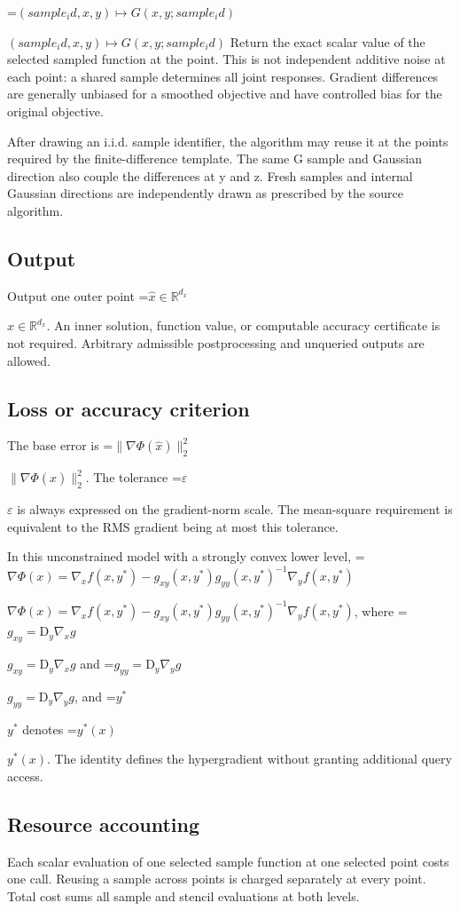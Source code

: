 \documentclass[10pt,a4paper]{article}
\newcommand{\AtlasMath}[1]{\par\begingroup\centering\setbox0=\hbox{$\displaystyle #1$}\ifdim\wd0>1.4\linewidth\typeout{ATLAS WIDE FORMULA: \the\wd0}\fi\ifdim\wd0>\linewidth\resizebox{\linewidth}{!}{\box0}\else\box0\fi\par\endgroup}
\newcommand{\AtlasInlineMath}[1]{\begingroup\setbox0=\hbox{$#1$}\ifdim\wd0>.4\linewidth\endgroup\AtlasMath{#1}\else\endgroup$#1$\fi}
\begin{document}
\AtlasInlineMath{(sample_id,x,y)\longmapsto G(x,y;sample_id)} Return the exact scalar value of the selected sampled function at the point. This is not independent additive noise at each point: a shared sample determines all joint responses. Gradient differences are generally unbiased for a smoothed objective and have controlled bias for the original objective.

After drawing an i.i.d. sample identifier, the algorithm may reuse it at the points required by the finite-difference template. The same G sample and Gaussian direction also couple the differences at y and z. Fresh samples and internal Gaussian directions are independently drawn as prescribed by the source algorithm.

\subsection{Output}
Output one outer point \AtlasInlineMath{\widehat{x}\in\mathbb{R}^{d_x}}. An inner solution, function value, or computable accuracy certificate is not required. Arbitrary admissible postprocessing and unqueried outputs are allowed.

\subsection{Loss or accuracy criterion}
The base error is \AtlasInlineMath{\|\nabla\Phi(\widehat{x})\|_2^2}. The tolerance \AtlasInlineMath{\varepsilon} is always expressed on the gradient-norm scale. The mean-square requirement is equivalent to the RMS gradient being at most this tolerance.

In this unconstrained model with a strongly convex lower level, \AtlasInlineMath{\nabla\Phi(x)=\nabla_x f(x,y^*)-g_{xy}(x,y^*)g_{yy}(x,y^*)^{-1}\nabla_y f(x,y^*)}, where \AtlasInlineMath{g_{xy}=\mathrm{D}_y\nabla_x g} and \AtlasInlineMath{g_{yy}=\mathrm{D}_y\nabla_y g}, and \AtlasInlineMath{y^*} denotes \AtlasInlineMath{y^*(x)}. The identity defines the hypergradient without granting additional query access.

\subsection{Resource accounting}
Each scalar evaluation of one selected sample function at one selected point costs one call. Reusing a sample across points is charged separately at every point. Total cost sums all sample and stencil evaluations at both levels.
\end{document}
